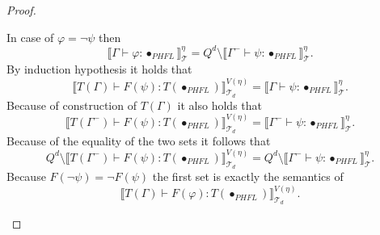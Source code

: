 \begin{proof}
\begin{compactitem}
        \item In case of $\varphi = \neg \psi$ then
        \[\llbracket \Gamma \vdash \varphi \colon \bullet_{PHFL} \rrbracket^\eta_\mathcal{T} = Q^d \setminus
        \llbracket
        \Gamma^-
        \vdash \psi \colon \bullet_{PHFL} \rrbracket^\eta_\mathcal{T}.\]
        By induction hypothesis it holds that \[\llbracket T(\Gamma) \vdash F(\psi) \colon T
        (\bullet_{PHFL}) \rrbracket^{V(\eta)}_{\mathcal{T}_d} = \llbracket \Gamma
        \vdash \psi \colon \bullet_{PHFL} \rrbracket^\eta_\mathcal{T}.\]
        Because of construction of $T(\Gamma)$ it also holds that
        \[\llbracket T(\Gamma^-) \vdash F(\psi) \colon T
        (\bullet_{PHFL}) \rrbracket^{V(\eta)}_{\mathcal{T}_d} = \llbracket \Gamma^-
        \vdash \psi \colon \bullet_{PHFL} \rrbracket^\eta_\mathcal{T}.\]
        Because of the equality of the two sets it follows that
        \[Q^d \setminus \llbracket T(\Gamma^-) \vdash F(\psi) \colon T(\bullet_{PHFL}) \rrbracket^{V(\eta)
        }_{\mathcal{T}_d} =
        Q^d \setminus \llbracket \Gamma^- \vdash \psi \colon \bullet_{PHFL} \rrbracket^\eta_\mathcal{T}.\]
        Because $F(\neg \psi) = \neg F(\psi)$ the first set is exactly the semantics of
        \[\llbracket T(\Gamma) \vdash F(\varphi) \colon T(\bullet_{PHFL}) \rrbracket^{V(\eta)}_{\mathcal{T}_d}.\]


\end{compactitem}
\end{proof}
